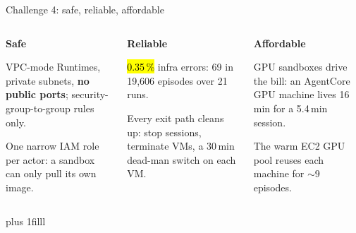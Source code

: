 \begin{frame}{Challenge 4: safe, reliable, affordable}
\begin{columns}[T]
\colorbox{panel}{\parbox[t][42mm]{\dimexpr\linewidth-2\fboxsep}{\raggedright\vspace{1.5mm}
{\large\bfseries\textcolor{awsteal}{Safe}}\par\vspace{1.5mm}\normalsize
VPC-mode Runtimes, private subnets, \textbf{no public ports}; security-group-to-group rules only.\par\vspace{1.5mm}
One narrow IAM role per actor: a sandbox can only pull its own image.}}
\colorbox{panel}{\parbox[t][42mm]{\dimexpr\linewidth-2\fboxsep}{\raggedright\vspace{1.5mm}
{\large\bfseries\textcolor{awsteal}{Reliable}}\par\vspace{1.5mm}\normalsize
\hl{0.35\,\%} infra errors: 69 in 19{,}606 episodes over 21 runs.\par\vspace{1.5mm}
Every exit path cleans up: stop sessions, terminate VMs, a 30\,min dead-man switch on each VM.}}
\colorbox{panel}{\parbox[t][42mm]{\dimexpr\linewidth-2\fboxsep}{\raggedright\vspace{1.5mm}
{\large\bfseries\textcolor{awsteal}{Affordable}}\par\vspace{1.5mm}\normalsize
GPU sandboxes drive the bill: an AgentCore GPU machine lives 16\,min for a 5.4\,min session.\par\vspace{1.5mm}
The warm EC2 GPU pool reuses each machine for $\sim$9 episodes.}}
\end{columns}
\par\vskip 0pt plus 1filll
\end{frame}

